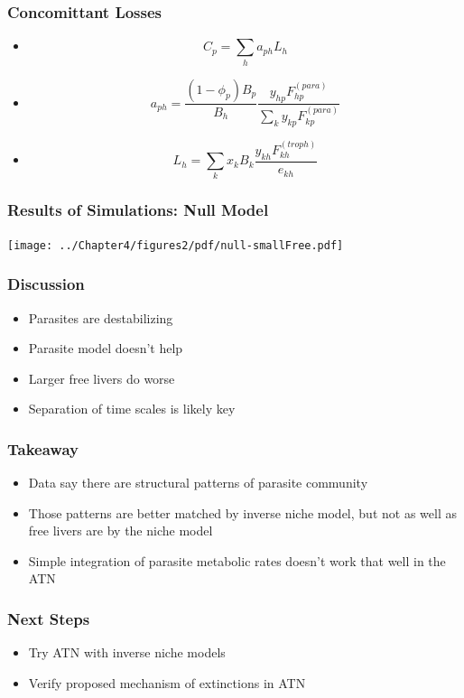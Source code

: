 \documentclass[table]{beamer}
\begin{document}
\begin{frame}
    \frametitle{Concomittant Losses}
    \begin{itemize}[<+->]
        \item \[C_p = \sum_ha_{ph}L_h  \]
        \item 
            \[ a_{ph} =
            \frac{(1-\phi_p)B_p}{B_h}\frac{y_{hp}^{}F_{hp}^{(para)}}{\sum_{k}y_{kp}^{}F^{(para)}_{kp}}\] 
        \item \[ 
            L_h = \sum_kx_kB_k\frac{y^{}_{kh}F^{(troph)}_{kh}}{e^{}_{kh}}\] 
    \end{itemize}
\end{frame}

\begin{frame}
    \frametitle{Results of Simulations: Null Model}
    \centering
    \texttt{[image: ../Chapter4/figures2/pdf/null-smallFree.pdf]}
\end{frame}

\begin{frame}
    \frametitle{Discussion}
    \begin{itemize}[<+->]
        \item Parasites are destabilizing
        \item Parasite model doesn't help
        \item Larger free livers do worse
        \item Separation of time scales is likely key
    \end{itemize}
\end{frame}

\begin{frame}
    \frametitle{Takeaway}
    \begin{itemize}[<+->]
        \item Data say there are structural patterns of parasite community 
        \item Those patterns are better matched by inverse niche model, but not as
            well as free livers are by the niche model
        \item Simple integration of parasite metabolic rates doesn't work that
            well in the ATN
    \end{itemize}
\end{frame}

\begin{frame}
    \frametitle{Next Steps}
    \begin{itemize}[<+->]
        \item Try ATN with inverse niche models
        \item Verify proposed mechanism of extinctions in ATN
    \end{itemize}
\end{frame}



\end{document}
